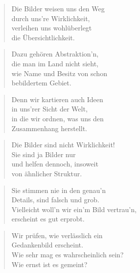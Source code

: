 \documentclass[10pt,a4paper]{article}
\begin{document}
\begin{paracol}{2}
\begin{verse}
Die Bilder weisen uns den Weg \\
durch uns’re Wirklichkeit, \\
verleihen uns wohlüberlegt \\
die Übersichtlichkeit. \\
\end{verse}

\begin{verse}
Dazu gehören Abstraktion’n, \\
die man im Land nicht sieht, \\
wie Name und Besitz von schon \\
bebildertem Gebiet. \\
\end{verse}

\begin{verse}
Denn wir kartieren auch Ideen \\
in uns’rer Sicht der Welt, \\
in die wir ordnen, was uns den \\
Zusammenhang herstellt. \\
\end{verse}

\begin{verse}
Die Bilder sind nicht Wirklichkeit! \\
Sie sind ja Bilder nur \\
und helfen dennoch, insoweit \\
von ähnlicher Struktur. \\
\end{verse}

\begin{verse}
Sie stimmen nie in den genau’n \\
Details, sind falsch und grob. \\
Vielleicht woll’n wir ein’m Bild vertrau’n, \\
erscheint es gut erprobt. \\
\end{verse}

\begin{verse}
Wir prüfen, wie verlässlich ein \\
Gedankenbild erscheint. \\
Wie sehr mag es wahrscheinlich sein? \\
Wie ernst ist es gemeint? \\
\end{verse}


\end{paracol}
\end{document}
